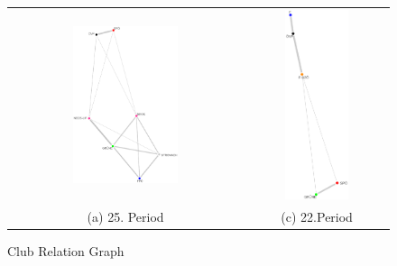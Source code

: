 \begin{figure}
\begin{tabular}{ c  c }
	\includegraphics[width=0.47\textwidth]{imgs/graphs/club-graphs/graph_25.eps} 
	& \includegraphics[width=0.47\textwidth]{imgs/graphs/club-graphs/graph_22.eps}
	\\
	(a) 25. Period 
	& (c) 22.Period
\end{tabular}
	\caption{Club Relation Graph}
	\label{fig:club_graphs1}
\end{figure}

